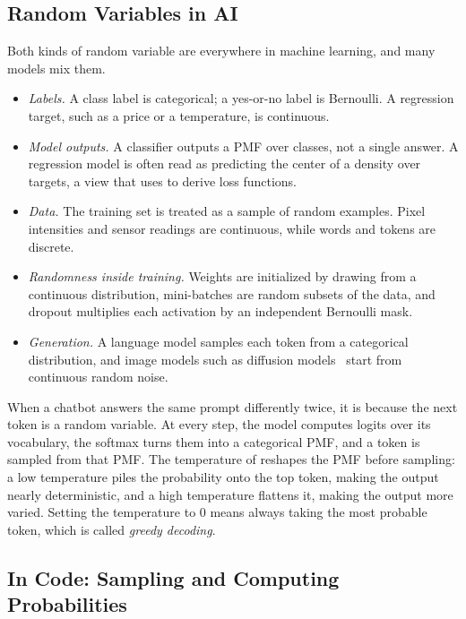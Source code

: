 \subsection{Random Variables in AI}
\label{sec:ch05-rv-ai}

Both kinds of random variable are everywhere in machine learning, and
many models mix them.
\begin{itemize}
  \item \emph{Labels.} A class label is categorical; a yes-or-no label
    is Bernoulli. A regression target, such as a price or a temperature,
    is continuous.
  \item \emph{Model outputs.} A classifier outputs a PMF over classes,
    not a single answer. A regression model is often read as predicting
    the center of a density over targets, a view that
     uses to derive loss functions.
  \item \emph{Data.} The training set is treated as a sample of random
    examples. Pixel intensities and sensor readings are continuous,
    while words and tokens are discrete.
  \item \emph{Randomness inside training.} Weights are initialized by
    drawing from a continuous distribution, mini-batches are random
    subsets of the data, and dropout multiplies each activation by an
    independent Bernoulli mask.
  \item \emph{Generation.} A language model samples each token from a
    categorical distribution, and image models such as diffusion
    models~\cite{ho2020ddpm} start from continuous random noise.
\end{itemize}

\begin{aibox}
  When a chatbot answers the same prompt differently twice, it is
  because the next token is a random variable. At every step, the model
  computes logits over its vocabulary, the softmax turns them into a
  categorical PMF, and a token is sampled from that PMF. The temperature
  of  reshapes the PMF before sampling: a low
  temperature piles the probability onto the top token, making the
  output nearly deterministic, and a high temperature flattens it,
  making the output more varied. Setting the temperature to $0$ means
  always taking the most probable token, which is called \emph{greedy
  decoding}.
\end{aibox}

\subsection{In Code: Sampling and Computing Probabilities}
\label{sec:ch05-rv-code}

